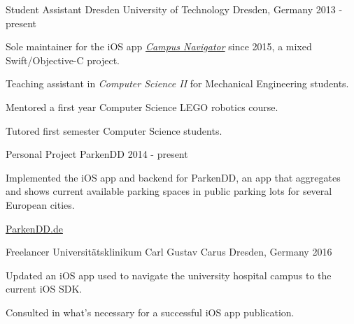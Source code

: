 

\begin{cventries}

\cventry
	{Student Assistant}
	{Dresden University of Technology}
	{Dresden, Germany}
	{2013 - present}
	{
		\begin{cvitems}
			\item {Sole maintainer for the iOS app \href{https://navigator.tu-dresden.de/mobile_apps}{\emph{Campus Navigator}} since 2015, a mixed Swift/Objective-C project.}
			\item {Teaching assistant in \emph{Computer Science II} for Mechanical Engineering students.}
			\item {Mentored a first year Computer Science LEGO robotics course.}
			\item {Tutored first semester Computer Science students.}
		\end{cvitems}
	}
	
	
\cventry
	{Personal Project}
	{ParkenDD}
	{}
	{2014 - present}
	{
		\begin{cvitems}
			\item {Implemented the iOS app and backend for ParkenDD, an app that aggregates and shows current available parking spaces in public parking lots for several European cities.}
			\item {\href{https://parkendd.de}{ParkenDD.de}}
		\end{cvitems}
	}
	
\cventry
	{Freelancer}
	{Universitätsklinikum Carl Gustav Carus}
	{Dresden, Germany}
	{2016}
	{
		\begin{cvitems}
			\item {Updated an iOS app used to navigate the university hospital campus to the current iOS SDK.}
			\item {Consulted in what's necessary for a successful iOS app publication.}
		\end{cvitems}
	}
	

\end{cventries}
